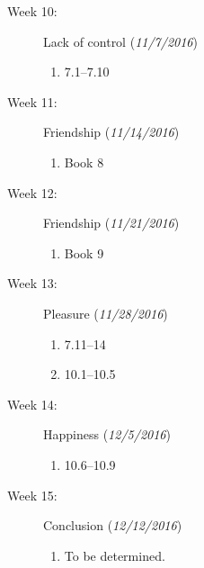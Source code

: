 \documentclass[article,oneside]{memoir}
\begin{document}
\begin{description}
\item[Week 10:] Lack of control  (\emph{11/7/2016})
\begin{enumerate}
\item 7.1--7.10
\end{enumerate}


\item[Week 11:] Friendship (\emph{11/14/2016})
\begin{enumerate}
\item Book 8
\end{enumerate}


\item[Week 12:] Friendship  (\emph{11/21/2016})
\begin{enumerate}
\item Book 9
\end{enumerate}


\item[Week 13:]  Pleasure (\emph{11/28/2016})
\begin{enumerate}
\item  7.11--14
\item 10.1--10.5
\end{enumerate}

\item[Week 14:]  Happiness (\emph{12/5/2016})
\begin{enumerate}
\item 10.6--10.9

\end{enumerate}

\item[Week 15:] Conclusion (\emph{12/12/2016})
\begin{enumerate}
\item To be determined. 
\end{enumerate}



\end{description}
\end{document}

